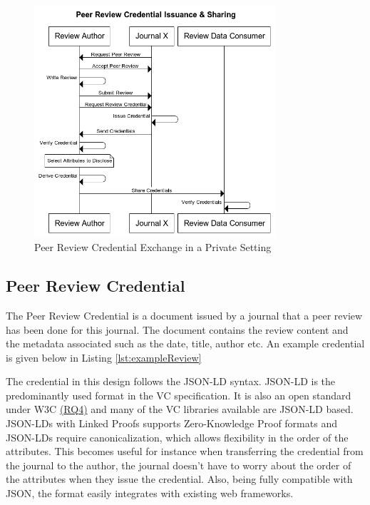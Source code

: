 \begin{figure}[htpb]
  \centering
  \includegraphics[width=0.8\textwidth]{figures/sequencePrivate.png}
  \caption{Peer Review Credential Exchange in a Private Setting} \label{fig:sequencePrivate}
\end{figure}

\subsection{Peer Review Credential}

The Peer Review Credential is a document issued by a journal that a peer review has been done for this journal. The document contains the review content and the metadata associated such as the date, title, author etc. An example credential is given below in Listing \ref{lst:exampleReview}



The credential in this design follows the \acrshort{JSON-LD} syntax. \acrshort{JSON-LD} is the predominantly used format in the \acrshort{VC} specification. It is also an open standard under W3C \parencite{jsonld} \hyperref[rq:open-standards]{(RQ4)} and many of the \acrshort{VC} libraries available are \acrshort{JSON-LD} based.  \acrshort{JSON-LD}s with Linked Proofs supports Zero-Knowledge Proof formats and \acrshort{JSON-LD}s require canonicalization, which allows flexibility in the order of the attributes. This becomes useful for instance when transferring the credential from the journal to the author, the journal doesn't have to worry about the order of the attributes when they issue the credential. Also, being fully compatible with \acrshort{JSON}, the format easily integrates with existing web frameworks. 

